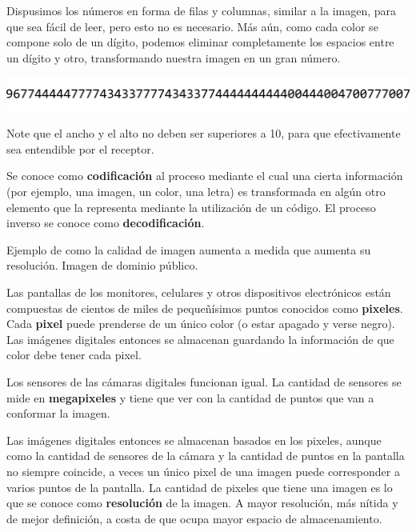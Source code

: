 Dispusimos los números en forma de filas y columnas, similar a la
imagen, para que sea fácil de leer, pero esto no es necesario. Más aún, como
cada color se compone solo de un dígito, podemos eliminar completamente los
espacios entre un dígito y otro, transformando nuestra imagen en un gran número.

\centerline{\includegraphics[]{capitulos/bajo_nivel/imagenes/pixels_car_numbers_final.png}}

Note que el ancho y el alto no deben ser superiores a 10, para que efectivamente
sea entendible por el receptor.

\begin{definition}
    Se conoce como \textbf{codificación} al proceso mediante el cual una cierta
    información (por ejemplo, una imagen, un color, una letra) es transformada
    en algún otro elemento que la representa mediante la utilización de un
    código. El proceso inverso se conoce como \textbf{decodificación}.
\end{definition}

{Ejemplo de como la calidad de imagen aumenta a medida que aumenta su resolución.}
{Imagen de dominio público.}

\begin{knowwhat}
Las pantallas de los monitores, celulares y otros dispositivos electrónicos
están compuestas de cientos de miles de pequeñísimos puntos conocidos como
\textbf{pixeles}. Cada \textbf{pixel} puede prenderse de un único color (o estar
apagado y verse negro). Las imágenes digitales entonces se almacenan guardando
la información de que color debe tener cada pixel.

Los sensores de las cámaras digitales funcionan igual. La cantidad de sensores
se mide en \textbf{megapixeles} y tiene que ver con la cantidad de puntos que
van a conformar la imagen.

Las imágenes digitales entonces se almacenan basados en los pixeles, aunque
como la cantidad de sensores de la cámara y la cantidad de puntos en la pantalla
no siempre coincide, a veces un único pixel de una imagen puede corresponder
a varios puntos de la pantalla. La cantidad de pixeles que tiene una imagen
es lo que se conoce como \textbf{resolución} de la imagen. A mayor resolución,
más nítida y de mejor definición, a costa de que ocupa mayor espacio de
almacenamiento.
\end{knowwhat}

